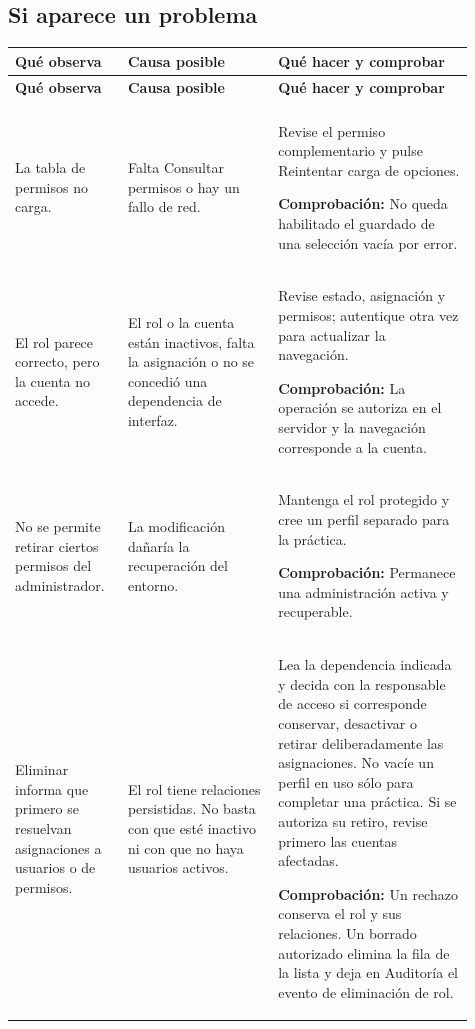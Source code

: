 \subsection{Si aparece un problema}
\begingroup
\fontsize{10}{12.5}\selectfont
\setlength{\tabcolsep}{5pt}
\renewcommand{\arraystretch}{1.15}
\begin{longtable}{@{}>{\RaggedRight\arraybackslash}p{0.22\linewidth}>{\RaggedRight\arraybackslash}p{0.3\linewidth}>{\RaggedRight\arraybackslash}p{0.39\linewidth}@{}}
\toprule
\textbf{Qué observa} & \textbf{Causa posible} & \textbf{Qué hacer y comprobar} \\
\midrule
\endfirsthead
\toprule
\textbf{Qué observa} & \textbf{Causa posible} & \textbf{Qué hacer y comprobar} \\
\midrule
\endhead
\midrule
\multicolumn{3}{r}{\footnotesize Continúa en la página siguiente}\\
\endfoot
\bottomrule
\endlastfoot
La tabla de permisos no carga. & Falta Consultar permisos o hay un fallo de red. & Revise el permiso complementario y pulse Reintentar carga de opciones.\par\smallskip\textbf{Comprobación:} No queda habilitado el guardado de una selección vacía por error. \\
\addlinespace[3pt]
El rol parece correcto, pero la cuenta no accede. & El rol o la cuenta están inactivos, falta la asignación o no se concedió una dependencia de interfaz. & Revise estado, asignación y permisos; autentique otra vez para actualizar la navegación.\par\smallskip\textbf{Comprobación:} La operación se autoriza en el servidor y la navegación corresponde a la cuenta. \\
\addlinespace[3pt]
No se permite retirar ciertos permisos del administrador. & La modificación dañaría la recuperación del entorno. & Mantenga el rol protegido y cree un perfil separado para la práctica.\par\smallskip\textbf{Comprobación:} Permanece una administración activa y recuperable. \\
\addlinespace[3pt]
Eliminar informa que primero se resuelvan asignaciones a usuarios o de permisos. & El rol tiene relaciones persistidas. No basta con que esté inactivo ni con que no haya usuarios activos. & Lea la dependencia indicada y decida con la responsable de acceso si corresponde conservar, desactivar o retirar deliberadamente las asignaciones. No vacíe un perfil en uso sólo para completar una práctica. Si se autoriza su retiro, revise primero las cuentas afectadas.\par\smallskip\textbf{Comprobación:} Un rechazo conserva el rol y sus relaciones. Un borrado autorizado elimina la fila de la lista y deja en Auditoría el evento de eliminación de rol. \\

\end{longtable}
